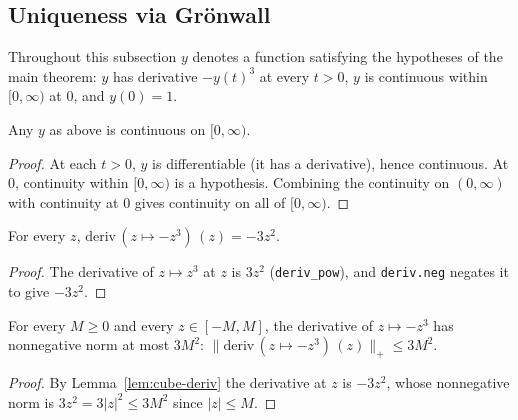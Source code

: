 \subsection{Uniqueness via Gr\"onwall}

Throughout this subsection $y$ denotes a function satisfying the hypotheses of the
main theorem: $y$ has derivative $-y(t)^3$ at every $t > 0$, $y$ is continuous
within $[0,\infty)$ at $0$, and $y(0) = 1$.

\begin{lemma}
    \label{lem:solution-continuous}
    \leanok
    Any $y$ as above is continuous on $[0,\infty)$.
\end{lemma}
\begin{proof}
    At each $t > 0$, $y$ is differentiable (it has a derivative), hence
    continuous. At $0$, continuity within $[0,\infty)$ is a hypothesis. Combining
    the continuity on $(0,\infty)$ with continuity at $0$ gives continuity on all
    of $[0,\infty)$.
\end{proof}

\begin{lemma}
    \label{lem:cube-deriv}
    \leanok
    For every $z$, $\mathrm{deriv}\,(z \mapsto -z^3)\,(z) = -3z^2$.
\end{lemma}
\begin{proof}
    The derivative of $z \mapsto z^3$ at $z$ is $3z^2$ (\texttt{deriv\_pow}),
    and \texttt{deriv.neg} negates it to give $-3z^2$.
\end{proof}

\begin{lemma}
    \label{lem:cube-deriv-bound}
    \leanok
    For every $M \ge 0$ and every $z \in [-M, M]$, the derivative of
    $z \mapsto -z^3$ has nonnegative norm at most $3M^2$:
    $\bigl\| \mathrm{deriv}\,(z \mapsto -z^3)\,(z) \bigr\|_+ \le 3M^2$.
\end{lemma}
\begin{proof}
    By Lemma~\ref{lem:cube-deriv} the derivative at $z$ is $-3z^2$, whose
    nonnegative norm is $3z^2 = 3|z|^2 \le 3M^2$ since $|z| \le M$.
\end{proof}

